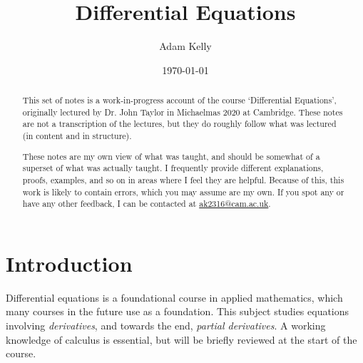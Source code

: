 \documentclass[a4paper]{scrreprt}
\title{Differential Equations}
\author{Adam Kelly}
\date{\today}
\begin{document}
\maketitle

\begin{abstract}
	

	This set of notes is a work-in-progress account of the course `Differential Equations', originally lectured by Dr. John Taylor in Michaelmas 2020 at Cambridge. These notes are not a transcription of the lectures, but they do roughly follow what was lectured (in content and in structure).

	These notes are my own view of what was taught, and should be somewhat of a superset of what was actually taught. I frequently provide different explanations, proofs, examples, and so on in areas where I feel they are helpful. Because of this, this work is likely to contain errors, which you may assume are my own. If you spot any or have any other feedback, I can be contacted at \href{mailto:ak2316@cam.ac.uk}{ak2316@cam.ac.uk}.



\end{abstract}

\tableofcontents

\clearpage

\chapter{Introduction}

Differential equations is a foundational course in applied mathematics, which many courses in the future use as a foundation. This subject studies equations involving \emph{derivatives}, and towards the end, \emph{partial derivatives}. A working knowledge of calculus is essential, but will be briefly reviewed at the start of the course. 
\end{document}
